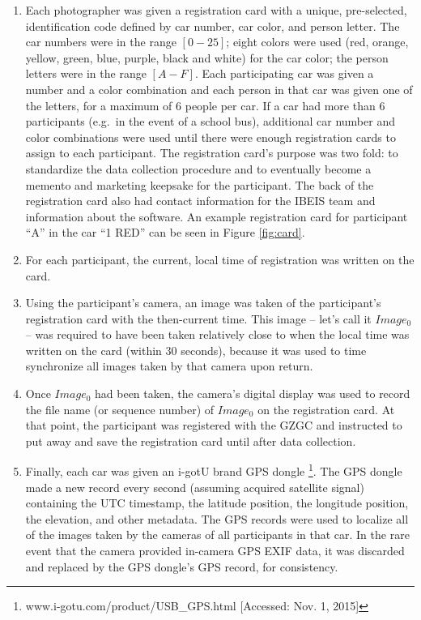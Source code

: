 \begin{enumerate}
    \item Each photographer was given a registration card with a unique, pre-selected, identification code defined by car number, car color, and person letter. The car numbers were in the range $[0-25]$; eight colors were used (red, orange, yellow, green, blue, purple, black and white) for the car color; the person letters were in the range $[A-F]$.  Each participating car was given a number and a color combination and each person in that car was given one of the letters, for a maximum of 6 people per car. If a car had more than 6 participants (e.g.\ in the event of a school bus), additional car number and color combinations were used until there were enough registration cards to assign to each participant.  The registration card's purpose was two fold: to standardize the data collection procedure and to eventually become a memento and marketing keepsake for the participant.  The back of the registration card also had contact information for the IBEIS team and information about the software.  An example registration card for participant ``A'' in the car ``1 RED'' can be seen in Figure \ref{fig:card}.
    \item For each participant, the current, local time of registration was written on the card.
    \item Using the participant's camera, an image was taken of the participant's registration card with the then-current time.  This image -- let's call it $Image_0$ -- was required to have been taken relatively close to when the local time was written on the card (within 30 seconds), because it was used to time synchronize all images taken by that camera upon return.
    \item Once $Image_0$ had been taken, the camera's digital display was used to record the file name (or sequence number) of $Image_0$ on the registration card.  At that point, the participant was registered with the GZGC and instructed to put away and save the registration card until after data collection.
    \item Finally, each car was given an i-gotU brand GPS dongle \footnote{www.i-gotu.com/product/USB\_GPS.html [Accessed: Nov. 1, 2015]}.   The GPS dongle made a new record every second (assuming acquired satellite signal) containing the UTC timestamp, the latitude position, the longitude position, the elevation, and other metadata.  The GPS records were used to localize all of the images taken by the cameras of all participants in that car.  In the rare event that the camera provided in-camera GPS EXIF data, it was discarded and replaced by the GPS dongle's GPS record, for consistency.
\end{enumerate}
